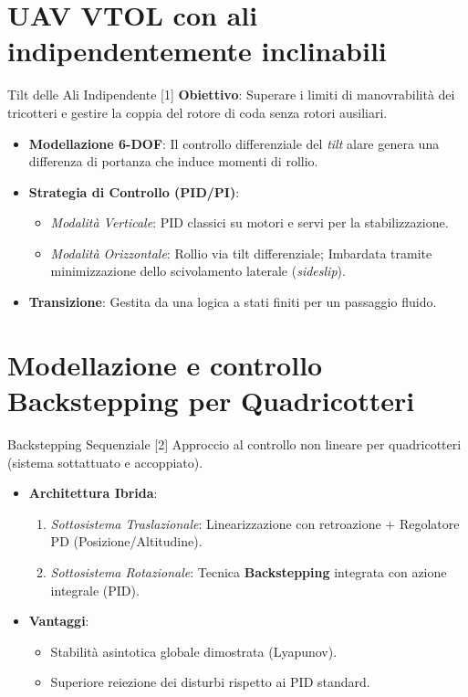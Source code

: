 \documentclass[aspectratio=169]{beamer}
\begin{document}
\section{UAV VTOL con ali indipendentemente inclinabili}

\begin{frame}{Tilt delle Ali Indipendente [1]}
    \textbf{Obiettivo}: Superare i limiti di manovrabilità dei tricotteri e gestire la coppia del rotore di coda senza rotori ausiliari.
    \vspace{0.3cm}
    \begin{itemize}
        \item \textbf{Modellazione 6-DOF}: Il controllo differenziale del \textit{tilt} alare genera una differenza di portanza che induce momenti di rollio.
        \item \textbf{Strategia di Controllo (PID/PI)}:
        \begin{itemize}
            \item \textit{Modalità Verticale}: PID classici su motori e servi per la stabilizzazione.
            \item \textit{Modalità Orizzontale}: Rollio via tilt differenziale; Imbardata tramite minimizzazione dello scivolamento laterale (\textit{sideslip}).
        \end{itemize}
        \item \textbf{Transizione}: Gestita da una logica a stati finiti per un passaggio fluido.
    \end{itemize}
\end{frame}

\section{Modellazione e controllo Backstepping per Quadricotteri}

\begin{frame}{Backstepping Sequenziale [2]}
    Approccio al controllo non lineare per quadricotteri (sistema sottattuato e accoppiato).
    \vspace{0.3cm}
    \begin{itemize}
        \item \textbf{Architettura Ibrida}:
        \begin{enumerate}
            \item \textit{Sottosistema Traslazionale}: Linearizzazione con retroazione + Regolatore PD (Posizione/Altitudine).
            \item \textit{Sottosistema Rotazionale}: Tecnica \textbf{Backstepping} integrata con azione integrale (PID).
        \end{enumerate}
        \item \textbf{Vantaggi}:
        \begin{itemize}
            \item Stabilità asintotica globale dimostrata (Lyapunov).
            \item Superiore reiezione dei disturbi rispetto ai PID standard.
        \end{itemize}
    \end{itemize}
\end{frame}
\end{document}

